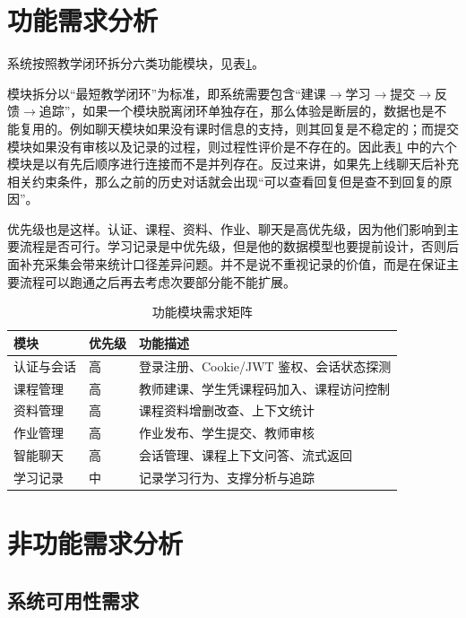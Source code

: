 \documentclass[12pt,a4paper,oneside]{ctexbook}
\numberwithin{equation}{chapter}
\begin{document}
\section{功能需求分析}
系统按照教学闭环拆分六类功能模块，见表\ref{tab:functionModules}。

模块拆分以“最短教学闭环”为标准，即系统需要包含“建课$\to$学习$\to$提交$\to$反馈$\to$追踪”，如果一个模块脱离闭环单独存在，那么体验是断层的，数据也是不能复用的。例如聊天模块如果没有课时信息的支持，则其回复是不稳定的；而提交模块如果没有审核以及记录的过程，则过程性评价是不存在的。因此表\ref{tab:functionModules} 中的六个模块是以有先后顺序进行连接而不是并列存在。反过来讲，如果先上线聊天后补充相关约束条件，那么之前的历史对话就会出现“可以查看回复但是查不到回复的原因”。

优先级也是这样。认证、课程、资料、作业、聊天是高优先级，因为他们影响到主要流程是否可行。学习记录是中优先级，但是他的数据模型也要提前设计，否则后面补充采集会带来统计口径差异问题。并不是说不重视记录的价值，而是在保证主要流程可以跑通之后再去考虑次要部分能不能扩展。

\begin{table}[H]
  \centering
  \caption{功能模块需求矩阵}
  \label{tab:functionModules}
  \begin{tabular}{p{2.6cm}p{1.6cm}p{8.5cm}}
    \toprule
    模块 & 优先级 & 功能描述 \\
    \midrule
    认证与会话 & 高 & 登录注册、Cookie/JWT 鉴权、会话状态探测 \\
    课程管理 & 高 & 教师建课、学生凭课程码加入、课程访问控制 \\
    资料管理 & 高 & 课程资料增删改查、上下文统计 \\
    作业管理 & 高 & 作业发布、学生提交、教师审核 \\
    智能聊天 & 高 & 会话管理、课程上下文问答、流式返回 \\
    学习记录 & 中 & 记录学习行为、支撑分析与追踪 \\
    \bottomrule
  \end{tabular}
\end{table}

\section{非功能需求分析}

\subsection{系统可用性需求}
\end{document}

